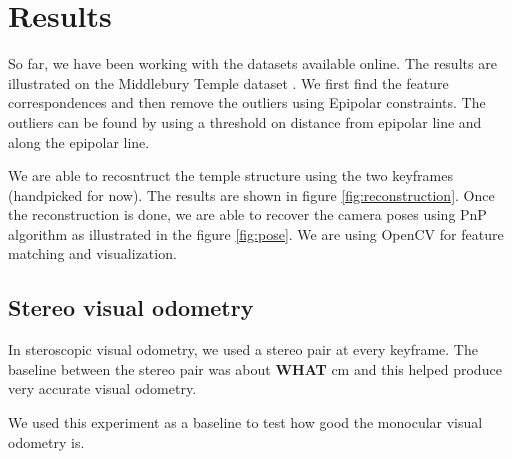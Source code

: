 \documentclass{article}
\begin{document}
\section{Results}
So far, we have been working with the datasets available online. The results are illustrated on the Middlebury Temple dataset \cite{middlebury}. We first find the feature correspondences and then remove the outliers using Epipolar constraints. The outliers can be found by using a threshold on distance from epipolar line and along the epipolar line.

We are able to recosntruct the temple structure using the two keyframes (handpicked for now). The results are shown in figure \ref{fig:reconstruction}. Once the reconstruction is done, we are able to recover the camera poses using PnP algorithm as illustrated in the figure \ref{fig:pose}. We are using OpenCV for feature matching and visualization.

\subsection{Stereo visual odometry}
In steroscopic visual odometry, we used a stereo pair at every keyframe. The baseline between the stereo pair was about \textbf{WHAT} cm and this helped produce very accurate visual odometry.

We used this experiment as a baseline to test how good the monocular visual odometry is.
\end{document}

